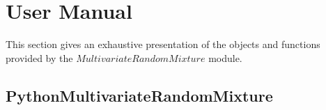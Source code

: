 
\section{User Manual}

This section gives an exhaustive presentation of the objects and functions provided by the $MultivariateRandomMixture$ module.

\subsection{PythonMultivariateRandomMixture}


